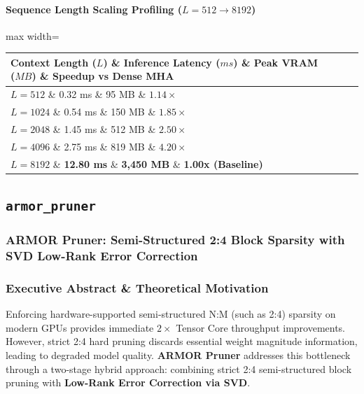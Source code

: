 \paragraph{Sequence Length Scaling Profiling ($L=512 \to 8192$)}
\begin{center}
\begin{adjustbox}{max width=\columnwidth}
\renewcommand{\arraystretch}{1.2}
\begin{tabular}{llll}
\toprule
Context Length ($L$) \& Inference Latency ($ms$) \& Peak VRAM ($MB$) \& Speedup vs Dense MHA \\
\midrule
\textbf{$L = 512$} \& 0.32 ms \& 95 MB \& $1.14\times$ \\
\textbf{$L = 1024$} \& 0.54 ms \& 150 MB \& $1.85\times$ \\
\textbf{$L = 2048$} \& 1.45 ms \& 512 MB \& $2.50\times$ \\
\textbf{$L = 4096$} \& 2.75 ms \& 819 MB \& $4.20\times$ \\
\textbf{$L = 8192$} \& \textbf{12.80 ms} \& \textbf{3,450 MB} \& \textbf{1.00x (Baseline)} \\


\bottomrule
\end{tabular}
\end{adjustbox}
\end{center}

\subsection{\texttt{armor\_pruner}}
\subsubsection*{ARMOR Pruner: Semi-Structured 2:4 Block Sparsity with SVD Low-Rank Error Correction}

\subsubsection*{Executive Abstract \& Theoretical Motivation}

Enforcing hardware-supported semi-structured N:M (such as 2:4) sparsity on modern GPUs provides immediate $2\times$ Tensor Core throughput improvements. However, strict 2:4 hard pruning discards essential weight magnitude information, leading to degraded model quality. \textbf{ARMOR Pruner} addresses this bottleneck through a two-stage hybrid approach: combining strict 2:4 semi-structured block pruning with \textbf{Low-Rank Error Correction via SVD}.

